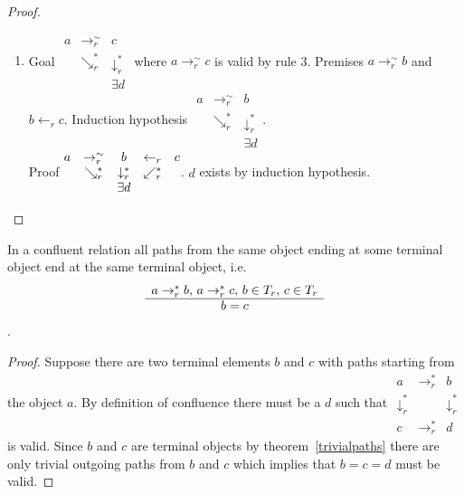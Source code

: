 \begin{theorem}
\begin{proof}
\begin{enumerate}
    \item
      Goal
      $\begin{matrix}
        a    & \to_r^\sim      & c                      \\
              & \searrow_r^* & \downarrow_r^*  \\
        & & \exists d
      \end{matrix}$
      where $a \to_r^\sim c$ is valid by rule 3. Premises $a \to_r^\sim b$
      and $b \gets_r c$.
      Induction hypothesis
      $\begin{matrix}
        a    & \to_r^\sim      & b                      \\
              & \searrow_r^* & \downarrow_r^*  \\
        & & \exists d
      \end{matrix}$.\\
      Proof
      $\begin{matrix}
        a              & \to^\sim_r       & b            & \gets_r & c \\
        & \searrow_r^* & \downarrow_r^* & \swarrow_r^* \\
        &              & \exists d
      \end{matrix}$.
      $d$ exists by induction hypothesis.
    \end{enumerate}
  \end{proof}
\end{theorem}


\begin{theorem}
  In a confluent relation all paths from the same object ending at some terminal
  object end at the same terminal object, i.e.
  $$\begin{array}{c} a \to_r^* b, \, a \to_r^* c, \, b \in T_r, \, c \in T_r \\ \hline b = c\end{array}$$.

  \begin{proof}
    Suppose there are two terminal elements $b$ and $c$ with paths starting
    from the object $a$.
    By definition of confluence there must be a $d$ such that
    $\begin{matrix} a & \to_r^* & b \\
      \downarrow_r^* & & \downarrow_r^* \\
      c & \to_r^* & d
    \end{matrix}$ is valid. Since $b$ and $c$ are terminal objects by
    theorem~\ref{trivialpaths} there are only trivial outgoing paths from $b$
    and $c$ which implies that $b = c = d$ must be valid.
  \end{proof}
\end{theorem}


